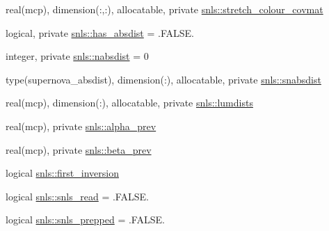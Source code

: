 \begin{DoxyCompactItemize}
\item 
real(mcp), dimension(\+:,\+:), allocatable, private \mbox{\hyperlink{namespacesnls_ad9f9a58ffeb62ad8e3c79c1c06f4fc1f}{snls\+::stretch\+\_\+colour\+\_\+covmat}}
\item 
logical, private \mbox{\hyperlink{namespacesnls_ac58c726d5874a3387309a8b805bfecee}{snls\+::has\+\_\+absdist}} = .F\+A\+L\+S\+E.
\item 
integer, private \mbox{\hyperlink{namespacesnls_afec63a8af55bb2bb06acac7b19c0fc4c}{snls\+::nabsdist}} = 0
\item 
type(supernova\+\_\+absdist), dimension(\+:), allocatable, private \mbox{\hyperlink{namespacesnls_aa9cb8d9344c2bfe3a01327e48ae3aaf1}{snls\+::snabsdist}}
\item 
real(mcp), dimension(\+:), allocatable, private \mbox{\hyperlink{namespacesnls_a5cc70993d1d6e6f59706685f982260ee}{snls\+::lumdists}}
\item 
real(mcp), private \mbox{\hyperlink{namespacesnls_a0037badcbc89a4f561b14d59f08c7d48}{snls\+::alpha\+\_\+prev}}
\item 
real(mcp), private \mbox{\hyperlink{namespacesnls_ad81e06277b2382bce10042fab9dcea40}{snls\+::beta\+\_\+prev}}
\item 
logical \mbox{\hyperlink{namespacesnls_a40ca845281c24a135e23e1a160610163}{snls\+::first\+\_\+inversion}}
\item 
logical \mbox{\hyperlink{namespacesnls_af9f3dc6698168f334d7e5066c0a1e9e5}{snls\+::snls\+\_\+read}} = .F\+A\+L\+S\+E.
\item 
logical \mbox{\hyperlink{namespacesnls_ae512c41362a8967df80f9101ef7e5fd3}{snls\+::snls\+\_\+prepped}} = .F\+A\+L\+S\+E.
\end{DoxyCompactItemize}
